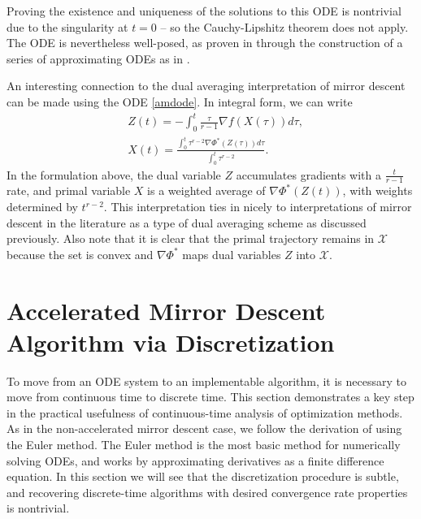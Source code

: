 Proving the existence and uniqueness of the solutions to this ODE is nontrivial due to the singularity at $t=0$ -- so the Cauchy-Lipshitz theorem does not apply. The ODE is nevertheless well-posed, as proven in  \citet{krichene2015accelerated} through the construction of a series of approximating ODEs as in \citet{su2014differential}. 

An interesting connection to the dual averaging interpretation of mirror descent can be made using the ODE \eqref{amdode}. In integral form, we can write
\begin{align*}
& Z(t) = -\int_0^t \frac{\tau}{r-1} \nabla f(X(\tau))d\tau,\\
&X(t) = \frac{\int_0^t \tau^{r-2} \nabla\Phi^*(Z(\tau)) d\tau}{\int_0^t \tau^{r-2}}. 
\end{align*}
In the formulation above, the dual variable $Z$ accumulates gradients with a $\frac{t}{r-1}$ rate, and primal variable $X$ is a weighted average of $\nabla\Phi^*(Z(t))$, with weights determined by $t^{r-2}$. This interpretation ties in nicely to interpretations of mirror descent in the literature as a type of dual averaging scheme as discussed previously.  Also note that it is clear that the primal trajectory remains in $\mathcal X$ because the set is convex and $\nabla\Phi^*$ maps dual variables $Z$ into $\mathcal X$.

\section{Accelerated Mirror Descent Algorithm via Discretization}
To move from an ODE system to an implementable algorithm, it is necessary to move from continuous time to discrete time. This section demonstrates a key step in the practical usefulness of continuous-time analysis of optimization methods. As in the non-accelerated mirror descent case, we follow the derivation of \citet{krichene2015accelerated} using the Euler method. The Euler method is the most basic method for numerically solving ODEs, and works by approximating derivatives as a finite difference equation. In this section we will see that the discretization procedure is subtle, and  recovering discrete-time algorithms with desired convergence rate properties is nontrivial.

